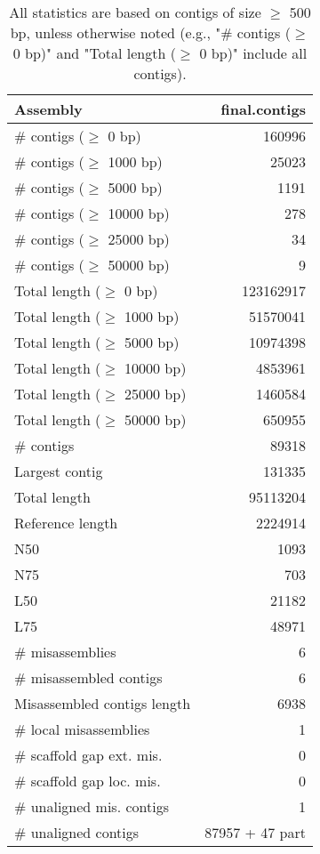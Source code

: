\documentclass[12pt,a4paper]{article}
\begin{document}
\begin{table}[ht]
\begin{center}
\caption{All statistics are based on contigs of size $\geq$ 500 bp, unless otherwise noted (e.g., "\# contigs ($\geq$ 0 bp)" and "Total length ($\geq$ 0 bp)" include all contigs).}
\begin{tabular}{|l*{1}{|r}|}
\hline
Assembly & final.contigs \\ \hline
\# contigs ($\geq$ 0 bp) & 160996 \\ \hline
\# contigs ($\geq$ 1000 bp) & 25023 \\ \hline
\# contigs ($\geq$ 5000 bp) & 1191 \\ \hline
\# contigs ($\geq$ 10000 bp) & 278 \\ \hline
\# contigs ($\geq$ 25000 bp) & 34 \\ \hline
\# contigs ($\geq$ 50000 bp) & 9 \\ \hline
Total length ($\geq$ 0 bp) & 123162917 \\ \hline
Total length ($\geq$ 1000 bp) & 51570041 \\ \hline
Total length ($\geq$ 5000 bp) & 10974398 \\ \hline
Total length ($\geq$ 10000 bp) & 4853961 \\ \hline
Total length ($\geq$ 25000 bp) & 1460584 \\ \hline
Total length ($\geq$ 50000 bp) & 650955 \\ \hline
\# contigs & 89318 \\ \hline
Largest contig & 131335 \\ \hline
Total length & 95113204 \\ \hline
Reference length & 2224914 \\ \hline
N50 & 1093 \\ \hline
N75 & 703 \\ \hline
L50 & 21182 \\ \hline
L75 & 48971 \\ \hline
\# misassemblies & 6 \\ \hline
\# misassembled contigs & 6 \\ \hline
Misassembled contigs length & 6938 \\ \hline
\# local misassemblies & 1 \\ \hline
\# scaffold gap ext. mis. & 0 \\ \hline
\# scaffold gap loc. mis. & 0 \\ \hline
\# unaligned mis. contigs & 1 \\ \hline
\# unaligned contigs & 87957 + 47 part \\ \hline

\end{tabular}
\end{center}
\end{table}
\end{document}
